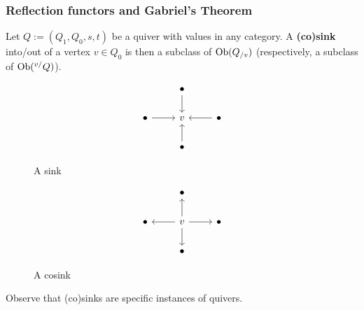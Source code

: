         \subsubsection{Reflection functors and Gabriel's Theorem}
            \begin{definition}[(Co)sinks] \label{def: (co)sinks}
                Let $Q := (Q_1, Q_0, s, t)$ be a quiver with values in any category. A \textbf{(co)sink} into/out of a vertex $v \in Q_0$ is then a subclass of $\mathrm{Ob}(Q_{/v})$ (respectively, a subclass of $\mathrm{Ob}({}^{v/}Q)$).
                    \begin{figure}[H]
                        \centering
                            $$
                                \begin{tikzcd}
                                	& \bullet \\
                                	\bullet & v & \bullet \\
                                	& \bullet
                                	\arrow[from=3-2, to=2-2]
                                	\arrow[from=2-1, to=2-2]
                                	\arrow[from=2-3, to=2-2]
                                	\arrow[from=1-2, to=2-2]
                                \end{tikzcd}
                            $$
                        \caption{A sink}
                        \label{fig: sink}
                    \end{figure}
                    \begin{figure}[H]
                        \centering
                            $$
                                \begin{tikzcd}
                                	& \bullet \\
                                	\bullet & v & \bullet \\
                                	& \bullet
                                	\arrow[from=2-2, to=3-2]
                                	\arrow[from=2-2, to=2-1]
                                	\arrow[from=2-2, to=2-3]
                                	\arrow[from=2-2, to=1-2]
                                \end{tikzcd}
                            $$
                        \caption{A cosink}
                        \label{fig: cosink}
                    \end{figure}
            \end{definition}
            \begin{remark}
                Observe that (co)sinks are specific instances of quivers. 
            \end{remark}
